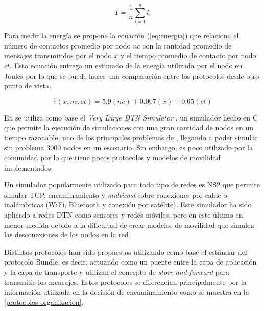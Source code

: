 \begin{equation}
    \label{eq:latencia}
    T = \frac{1}{n}\sum_{i = 1}^n l_i
\end{equation}


Para medir la energía se propone la ecuación (\ref{eq:energia})
\cite{martin-campillo_energy-efficient_2012} que relaciona el número de
contactos promedio por nodo $nc$ con la cantidad promedio de  mensajes
transmitidos por el nodo $x$ y el tiempo promedio de contacto por nodo $ct$.
Esta ecuación entrega un estimado de la energía utilizada por el nodo en Joules
por lo que se puede hacer una comparación entre los protocolos desde otro punto
de vista.


\begin{equation}
    \label{eq:energia}
    e(x, nc, ct) = 5.9(nc) + 0.007(x) + 0.05(ct)
\end{equation}



En \cite{Sidera2016} se utiliza como base el \textit{Very Large DTN Simulator}
\cite{vl-dtn-simulator}, un simulador hecho en C que permite la ejecución de
simulaciones con una gran cantidad de nodos en un tiempo razonable, uno de los
principales problemas de \theone{}, llegando a poder simular sin problema 3000
nodos en un escenario. Sin embargo, es poco utilizado por la comunidad por lo
que tiene pocos protocolos y modelos de movilidad implementados.

Un simulador popularmente utilizado para todo tipo de redes es NS2 \cite{ns2}
que permite simular TCP, encaminamiento y \textit{multicast} sobre conexiones
por cable o inalámbricas (WiFi, Bluetooth y conexión por satélite). Este
simulador ha sido aplicado a redes DTN como sensores y redes móviles, pero en
este último en menor medida debido a la dificultad de crear modelos de movilidad
que simulen las desconexiones de los nodos en la red.








Distintos protocolos han sido propuestos utilizando como base el estándar del
protocolo Bundle, es decir, actuando como un puente entre la capa de aplicación
y la capa de transporte y utilizan el concepto de \textit{store-and-forward}
para transmitir los mensajes.  Estos protocolos se diferencian principalmente
por la información utilizada en la decisión de encaminamiento como se muestra en
la \ref{protocolos-organizacion}.

